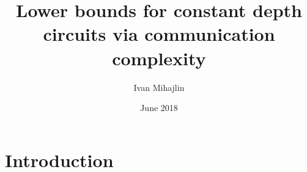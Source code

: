 \documentclass{article}
\title{Lower bounds for constant depth circuits via communication complexity}
\author{Ivan Mihajlin}
\date{June 2018}
\begin{document}
\maketitle

\section{Introduction}
\end{document}
